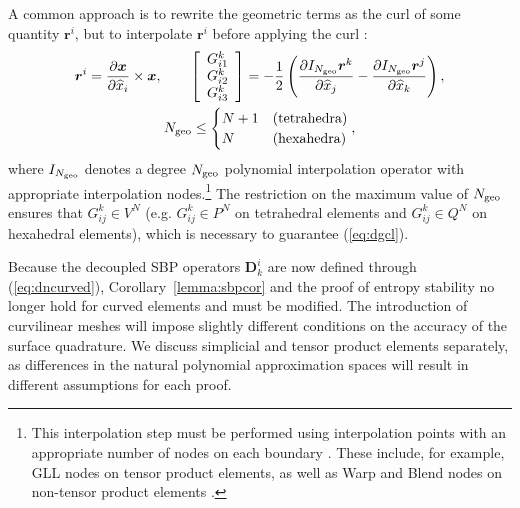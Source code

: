 \documentclass{svjour3}                     %
\renewcommand{\hat}{\widehat}
\newcommand{\pd}[2]{\frac{\partial#1}{\partial#2}}
\newcommand{\LRp}[1]{\left( #1 \right)}
\newcommand{\LRs}[1]{\left[ #1 \right]}
\begin{document}
A common approach is to rewrite the geometric terms as the curl of some quantity $\bm{r}^i$, but to interpolate $\bm{r}^i$ before applying the curl \cite{visbal2002use, kopriva2006metric, hindenlang2012explicit, chan2018discretely}:
\begin{gather}
\bm{r}^i = { \pd{\bm{x}}{\hat{x}_i}\times \bm{x}}, \qquad
\LRs{\begin{array}{c}
{G}^k_{i1}\\
{G}^k_{i2}\\
{G}^k_{i3}\end{array}} = -\frac{1}{2}\LRp{\pd{I_{N_{\rm geo}}\bm{r}^k}{\hat{x}_j}-\pd{I_{N_{\rm geo}}\bm{r}^j}{\hat{x}_k}},\\
N_{\rm geo} \leq \begin{cases}
N+1 & \text{(tetrahedra)}\\
N & \text{(hexahedra)}
\end{cases},\nonumber
\label{eq:iconscurl}
\end{gather}
where $I_{N_{\rm geo}}$ denotes a degree $N_{\rm geo}$ polynomial interpolation operator with appropriate interpolation nodes.\footnote{This interpolation step must be performed using interpolation points with an appropriate number of nodes on each boundary \cite{chan2018discretely}.  These include, for example, GLL nodes on tensor product elements, as well as Warp and Blend nodes on non-tensor product elements \cite{warburton2006explicit, chan2015comparison}.}  The restriction on the maximum value of $N_{\rm geo}$ ensures that $G^k_{ij} \in V^N$ (e.g. $G^k_{ij} \in P^N$ on tetrahedral elements and $G^k_{ij}\in Q^N$ on hexahedral elements), which is necessary to guarantee (\ref{eq:dgcl}).

Because the decoupled SBP operators $\bm{D}^i_k$ are now defined through (\ref{eq:dncurved}), Corollary~\ref{lemma:sbpcor} and the proof of entropy stability no longer hold for curved elements and must be modified.  The introduction of curvilinear meshes will impose slightly different conditions on the accuracy of the surface quadrature.  We discuss simplicial and tensor product elements separately, as differences in the natural polynomial approximation spaces will result in different assumptions for each proof.
\end{document}

